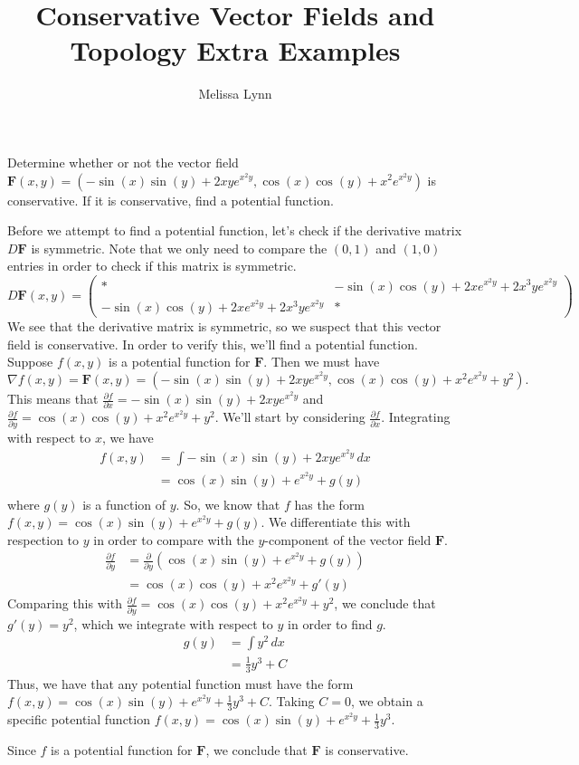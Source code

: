 \documentclass{ximera}
\title{Conservative Vector Fields and Topology Extra Examples}
\author{Melissa Lynn}
\begin{document}
  
\begin{abstract}  
\end{abstract}  
\maketitle


\begin{example}
Determine whether or not the vector field $\mathbf{F}(x,y) = (-\sin(x)\sin(y)+2xye^{x^2y},\cos(x)\cos(y)+x^2e^{x^2y})$ is conservative. If it is conservative, find a potential function.
\begin{explanation}
Before we attempt to find a potential function, let's check if the derivative matrix $D\mathbf{F}$ is symmetric. Note that we only need to compare the $(0,1)$ and $(1,0)$ entries in order to check if this matrix is symmetric.
\[
D\mathbf{F}(x,y) = \left(\begin{array}{cc}
*&-\sin(x)\cos(y)+2xe^{x^2y}+2x^3ye^{x^2y}\\
-\sin(x)\cos(y)+2xe^{x^2y}+2x^3ye^{x^2y}&*\end{array}\right)
\]
We see that the derivative matrix is symmetric, so we suspect that this vector field is conservative. In order to verify this, we'll find a potential function.
Suppose $f(x,y)$ is a potential function for $\mathbf{F}$. Then we must have
\[
\nabla f(x,y)=\mathbf{F}(x,y)=(-\sin(x)\sin(y)+2xye^{x^2y},\cos(x)\cos(y)+x^2e^{x^2y}+y^2).
\]
This means that $\frac{\partial f}{\partial x} = -\sin(x)\sin(y)+2xye^{x^2y}$ and $\frac{\partial f}{\partial y} = \cos(x)\cos(y)+x^2e^{x^2y}+y^2$. We'll start by considering $\frac{\partial f}{\partial x}$. Integrating with respect to $x$, we have
\begin{align*}
f(x,y) &= \int -\sin(x)\sin(y)+2xye^{x^2y}\,dx\\
&= \cos(x)\sin(y)+e^{x^2y}+g(y)\\
\end{align*}
where $g(y)$ is a function of $y$. So, we know that $f$ has the form $f(x,y)=\cos(x)\sin(y)+e^{x^2y}+g(y)$. We differentiate this with respection to $y$ in order to compare with the $y$-component of the vector field $\mathbf{F}$.
\begin{align*}
\frac{\partial f}{\partial y} &= \frac{\partial}{\partial y}\left(\cos(x)\sin(y)+e^{x^2y}+g(y)\right)\\
&= \cos(x)\cos(y) + x^2e^{x^2y}+g'(y)
\end{align*}
Comparing this with $\frac{\partial f}{\partial y} = \cos(x)\cos(y)+x^2e^{x^2y}+y^2$, we conclude that $g'(y)=y^2$, which we integrate with respect to $y$ in order to find $g$.
\begin{align*}
g(y) &= \int y^2\,dx\\
&=\frac{1}{3}y^3+C
\end{align*}
Thus, we have that any potential function must have the form $f(x,y) = \cos(x)\sin(y)+e^{x^2y}+\frac{1}{3}y^3+C$. Taking $C=0$, we obtain a specific potential function $f(x,y) = \cos(x)\sin(y)+e^{x^2y}+\frac{1}{3}y^3$.

Since $f$ is a potential function for $\mathbf{F}$, we conclude that $\mathbf{F}$ is conservative.
\end{explanation}
\end{example}
\end{document}

